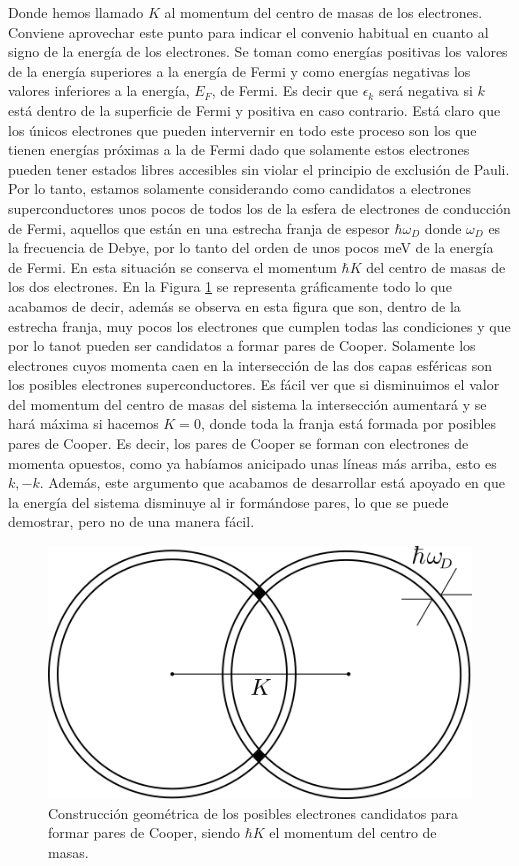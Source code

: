 Donde hemos llamado $K$ al momentum del centro de masas de los electrones. Conviene aprovechar este punto para indicar el convenio habitual en cuanto al signo de la energía de los electrones. Se toman como energías positivas los valores de la energía superiores a la energía de Fermi y como energías negativas los valores inferiores a la energía, $E_F$, de Fermi. Es decir que $\epsilon_k$ será negativa si $k$ está dentro de la superficie de Fermi y positiva en caso contrario. Está claro que los únicos electrones que pueden intervernir en todo este proceso son los que tienen energías próximas a la de Fermi dado que solamente estos electrones pueden tener estados libres accesibles sin violar el principio de exclusión de Pauli. Por lo tanto, estamos solamente considerando como candidatos a electrones superconductores unos pocos de todos los de la esfera de electrones de conducción de Fermi, aquellos que están en una estrecha franja de espesor $\hbar \omega_D$ donde $\omega_D$ es la frecuencia de Debye, por lo tanto del orden de unos pocos meV de la energía de Fermi. En esta situación se conserva el momentum $\hbar K$ del centro de masas de los dos electrones. En la Figura \ref{fig:goodcooper} se representa gráficamente todo lo que acabamos de decir, además se observa en esta figura que son, dentro de la estrecha franja, muy pocos los electrones que cumplen todas las condiciones y que por lo tanot pueden ser candidatos a formar pares de Cooper. Solamente los electrones cuyos momenta caen en la intersección de las dos capas esféricas son los posibles electrones superconductores. Es fácil ver que si disminuimos el valor del momentum del centro de masas del sistema la intersección aumentará y se hará máxima si hacemos $K = 0$, donde toda la franja está formada por posibles pares de Cooper. Es decir, los pares de Cooper se forman con electrones de momenta opuestos, como ya habíamos anicipado unas líneas más arriba, esto es $k, -k$.  Además, este argumento que acabamos de desarrollar está apoyado en que la energía del sistema disminuye al ir formándose pares, lo que se puede demostrar, pero no de una manera fácil.

\begin{figure}[H]
\centering \includegraphics[width=0.6\linewidth]{img/goodcooper.png}
\caption{Construcción geométrica de los posibles electrones candidatos para formar pares de Cooper, siendo $\hbar K$ el momentum del centro de masas.}
\label{fig:goodcooper}
\end{figure}

